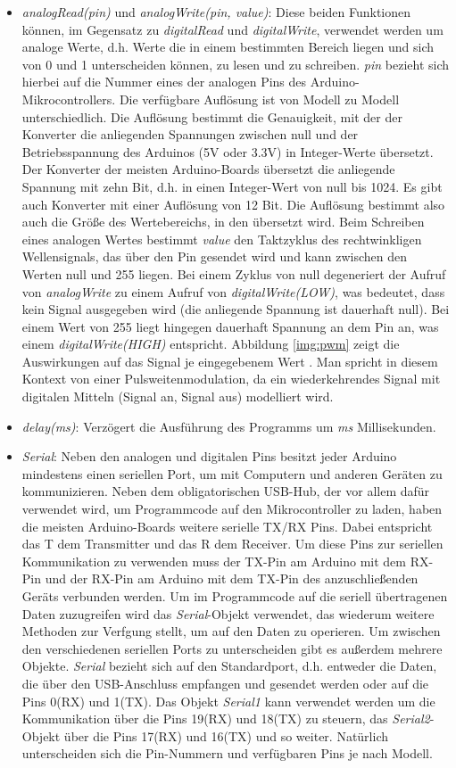 \begin{itemize}
    \item \textit{analogRead(pin)} und \textit{analogWrite(pin, value)}: Diese beiden Funktionen können, im Gegensatz zu \textit{digitalRead} und \textit{digitalWrite}, verwendet werden um analoge Werte, d.h. Werte die in einem bestimmten Bereich liegen und sich von 0 und 1 unterscheiden können, zu lesen und zu schreiben. \textit{pin} bezieht sich hierbei auf die Nummer eines der analogen Pins des Arduino-Mikrocontrollers. Die verfügbare Auflösung ist von Modell zu Modell unterschiedlich. Die Auflösung bestimmt die Genauigkeit, mit der der Konverter die anliegenden Spannungen zwischen null und der Betriebsspannung des Arduinos (5V oder 3.3V) in Integer-Werte übersetzt. Der Konverter der meisten Arduino-Boards übersetzt die anliegende Spannung mit zehn Bit, d.h. in einen Integer-Wert von null bis 1024. Es gibt auch Konverter mit einer Auflösung von 12 Bit. Die Auflösung bestimmt also auch die Größe des Wertebereichs, in den übersetzt wird. Beim Schreiben eines analogen Wertes bestimmt \textit{value} den Taktzyklus des rechtwinkligen Wellensignals, das über den Pin gesendet wird und kann zwischen den Werten null und 255 liegen. Bei einem Zyklus von null degeneriert der Aufruf von \textit{analogWrite} zu einem Aufruf von \textit{digitalWrite(LOW)}, was bedeutet, dass kein Signal ausgegeben wird (die anliegende Spannung ist dauerhaft null). Bei einem Wert von 255 liegt hingegen dauerhaft Spannung an dem Pin an, was einem \textit{digitalWrite(HIGH)} entspricht. Abbildung \ref{img:pwm} zeigt die Auswirkungen auf das Signal je eingegebenem Wert \cite{pwm}. Man spricht in diesem Kontext von einer \glqq{}Pulsweitenmodulation\grqq{}, da ein wiederkehrendes Signal mit digitalen Mitteln (Signal an, Signal aus) modelliert wird. 
    \item \textit{delay(ms)}: Verzögert die Ausführung des Programms um \textit{ms} Millisekunden.
    \item \textit{Serial}: Neben den analogen und digitalen Pins besitzt jeder Arduino mindestens einen seriellen Port, um mit Computern und anderen Geräten zu kommunizieren. Neben dem obligatorischen USB-Hub, der vor allem dafür verwendet wird, um Programmcode auf den Mikrocontroller zu laden, haben die meisten Arduino-Boards weitere serielle TX/RX Pins. Dabei entspricht das \glqq{}T\grqq{} dem \glqq{}Transmitter\grqq{} und das \glqq{}R\grqq{} dem \glqq{}Receiver\grqq{}. Um diese Pins zur seriellen Kommunikation zu verwenden muss der TX-Pin am Arduino mit dem RX-Pin und der RX-Pin am Arduino mit dem TX-Pin des anzuschließenden Geräts verbunden werden. Um im Programmcode auf die seriell übertragenen Daten zuzugreifen wird das \textit{Serial}-Objekt verwendet, das wiederum weitere Methoden zur Verfgung stellt, um auf den Daten zu operieren. Um zwischen den verschiedenen seriellen Ports zu unterscheiden gibt es außerdem mehrere Objekte. \textit{Serial} bezieht sich auf den Standardport, d.h. entweder die Daten, die über den USB-Anschluss empfangen und gesendet werden oder auf die Pins 0(RX) und 1(TX). Das Objekt \textit{Serial1} kann verwendet werden um die Kommunikation über die Pins 19(RX) und 18(TX) zu steuern, das \textit{Serial2}-Objekt über die Pins 17(RX) und 16(TX) und so weiter. Natürlich unterscheiden sich die Pin-Nummern und verfügbaren Pins je nach Modell.

\end{itemize}
